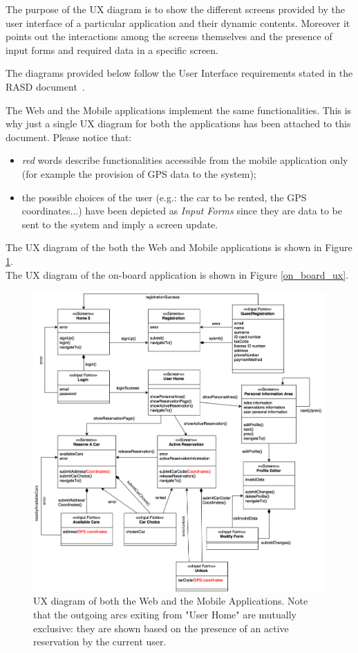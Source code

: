 The purpose of the UX diagram is to show the different screens provided by the user interface of a particular application and their dynamic contents. Moreover it points out the interactions among the screens themselves and the presence of input forms and required data in a specific screen.

The diagrams provided below follow the User Interface requirements stated in the RASD document~\cite{rasd}.

The Web and the Mobile applications implement the same functionalities. This is why just a single UX diagram for both the applications has been attached to this document. Please notice that:
\begin{itemize}
\item \emph{\color{red} red} words describe functionalities accessible from the mobile application only (for example the provision of GPS data to the system);
\item the possible choices of the user (e.g.: the car to be rented, the GPS coordinates...) have been depicted as \emph{Input Forms} since they are data to be sent to the system and imply a screen update.
\end{itemize}
The UX diagram of the both the Web and Mobile applications is shown in Figure \ref{web_mobile_ux}. \\
The UX diagram of the on-board application is shown in Figure \ref{on_board_ux}.

\begin{figure}[H]
\begin{center}
		\includegraphics[width=\textwidth]{./user_interface_design/diagrams/web_mobile_ux.png}
		\caption{UX diagram of both the Web and the Mobile Applications. Note that the outgoing arcs exiting from "User Home" are mutually exclusive: they are shown based on the presence of an active reservation by the current user.}
		\label{web_mobile_ux}
\end{center}
\end{figure}

